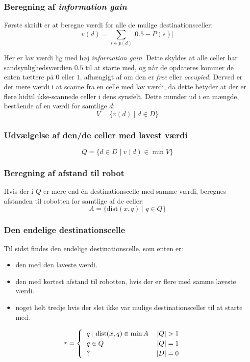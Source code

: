 \subsubsection{Beregning af \textit{information gain}}
Første skridt er at beregne værdi for alle de mulige destinationsceller:
\begin{equation}
v(d) = \sum_{s \in p(d)} |0.5 - P(s)|
\end{equation}

Her er lav værdi lig med høj \textit{information gain}.
Dette skyldes at alle celler har sandsynlighedsværdien $0.5$ til at starte med, og når de opdateres kommer de enten tættere på $0$ eller $1$, afhængigt af om den er \textit{free} eller \textit{occupied}.
Derved er der mere værdi i at scanne fra en celle med lav værdi, da dette betyder at der er flere hidtil ikke-scannede celler i dens synsfelt.
Dette munder ud i en mængde, bestående af en værdi for samtlige $d$:
\begin{equation}
V = \{ v(d) \mid d \in D \}
\end{equation}

\subsubsection{Udvælgelse af den/de celler med lavest værdi}
\begin{equation}
Q = \{ d \in D \mid v(d) \in \min V \}
\end{equation}

\subsubsection{Beregning af afstand til robot}
Hvis der i $Q$ er mere end én destinationscelle med samme værdi, beregnes afstanden til robotten for samtlige af de celler:
\begin{equation}
A = \{ \text{dist}(x,q) \mid q \in Q \}
\end{equation}

\subsubsection{Den endelige destinationscelle}
Til sidst findes den endelige destinationscelle, som enten er:
\begin{itemize}
\item{den med den laveste værdi.}
\item{den med kortest afstand til robotten, hvis der er flere med samme laveste værdi.}
\item{noget helt tredje hvis der slet ikke var mulige destinationsceller til at starte med.}
\end{itemize}
\begin{equation}
r = \begin{cases}
\begin{tabular}{lr}
$q \mid \text{dist}(x,q) \in \min A$ & $|Q| > 1$\\
$q \in Q$ & $|Q| = 1$ \\
$?$ & $|D| = 0$
\end{tabular}
\end{cases}
\end{equation}


